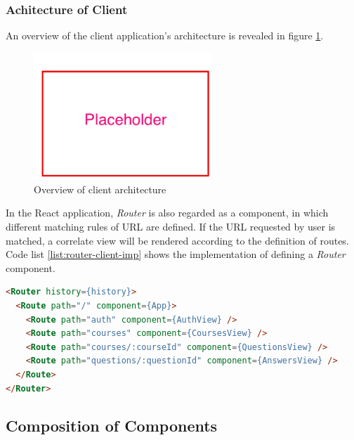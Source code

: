 \subsubsection{Achitecture of Client}

An overview of the client application's architecture is revealed in figure \ref{fig:client-arch-imp}. 

\begin{figure}[!htbp]
  \centering
    \includegraphics[width=0.6\textwidth]{Figures/placeholder.png}
  \caption{Overview of client architecture}
  \label{fig:client-arch-imp}
\end{figure}

In the React application, \textit{Router} is also regarded  as a component, in which different matching rules of URL are defined. If the URL requested by user is matched, a correlate view will be rendered according to the definition of routes. Code list \ref{list:router-client-imp} shows the implementation of defining a \textit{Router} component.

\begin{lstlisting}[language=HTML, caption=Router in client app , label={list:router-client-imp}]
<Router history={history}>
  <Route path="/" component={App}>
    <Route path="auth" component={AuthView} />
    <Route path="courses" component={CoursesView} />
    <Route path="courses/:courseId" component={QuestionsView} />
    <Route path="questions/:questionId" component={AnswersView} />
  </Route>
</Router>
\end{lstlisting}








\subsection{Composition of Components}

